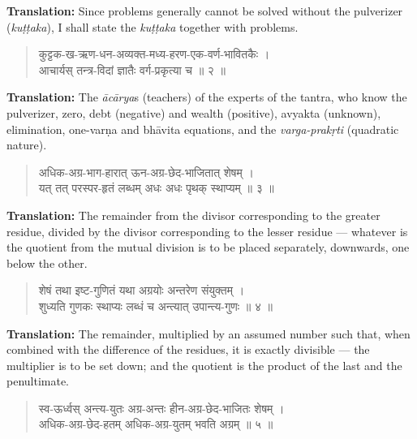 \documentclass[11pt,a4paper]{article}
\newenvironment{shloka}{\begin{verse}\devanagarifont\large}{\end{verse}}
\begin{document}
\textbf{Translation:}\quad
Since problems generally cannot be solved without the pulverizer
(\textit{kuṭṭaka}), I shall state the \textit{kuṭṭaka} together with
problems.

\vspace{0.3cm}

\begin{shloka}
कुट्टक-ख-ऋण-धन-अव्यक्त-मध्य-हरण-एक-वर्ण-भावितकैः ।\\
आचार्यस् तन्त्र-विदां ज्ञातैः वर्ग-प्रकृत्या च ॥ २ ॥
\end{shloka}

\textbf{Translation:}\quad
The \textit{ācārya}s (teachers) of the experts of the tantra, who
know the pulverizer, zero, debt (negative) and wealth (positive),
avyakta (unknown), elimination, one-varṇa and bhāvita equations,
and the \textit{varga-prakṛti} (quadratic nature).

\vspace{0.3cm}

\begin{shloka}
अधिक-अग्र-भाग-हारात् ऊन-अग्र-छेद-भाजितात् शेषम् ।\\
यत् तत् परस्पर-हृतं लब्धम् अधः अधः पृथक् स्थाप्यम् ॥ ३ ॥
\end{shloka}

\textbf{Translation:}\quad
The remainder from the divisor corresponding to the greater residue,
divided by the divisor corresponding to the lesser residue — whatever
is the quotient from the mutual division is to be placed separately,
downwards, one below the other.

\vspace{0.3cm}

\begin{shloka}
शेषं तथा इष्ट-गुणितं यथा अग्रयोः अन्तरेण संयुक्तम् ।\\
शुध्यति गुणकः स्थाप्यः लब्धं च अन्त्यात् उपान्त्य-गुणः ॥ ४ ॥
\end{shloka}

\textbf{Translation:}\quad
The remainder, multiplied by an assumed number such that, when
combined with the difference of the residues, it is exactly
divisible — the multiplier is to be set down; and the quotient is
the product of the last and the penultimate.

\vspace{0.3cm}

\begin{shloka}
स्व-ऊर्ध्वस् अन्त्य-युतः अग्र-अन्तः हीन-अग्र-छेद-भाजितः शेषम् ।\\
अधिक-अग्र-छेद-हतम् अधिक-अग्र-युतम् भवति अग्रम् ॥ ५ ॥
\end{shloka}
\end{document}

